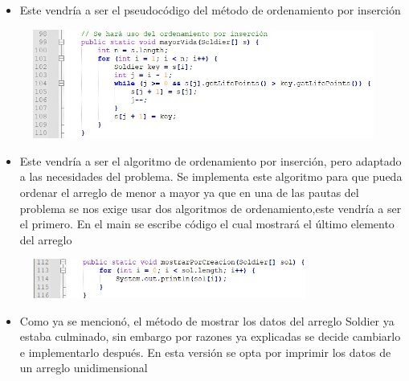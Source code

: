 \documentclass{article}
\begin{document}
	\begin{itemize}	
		\item Este vendría a ser el pseudocódigo del método de ordenamiento por inserción
	\end{itemize}
		
		
	\begin{figure}[H]
		\centering
		\includegraphics[width=1.2\textwidth,keepaspectratio]{img/5.jpg}
	\end{figure}	
		
	\begin{itemize}	
		\item Este vendría a ser el algoritmo de ordenamiento por inserción, pero adaptado a las necesidades del problema. Se implementa este algoritmo para que pueda ordenar el arreglo de menor a mayor ya que en una de las pautas del problema se nos exige usar dos algoritmos de ordenamiento,este vendría a ser el primero. En el main se escribe código el cual mostrará el último elemento del arreglo
	\end{itemize}
		
	\begin{figure}[H]
		\centering
		\includegraphics[width=0.8\textwidth,keepaspectratio]{img/6.jpg}
	\end{figure}
	 
	
	\begin{itemize}	
		\item Como ya se mencionó, el método de mostrar los datos del arreglo Soldier ya estaba culminado, sin embargo por razones ya explicadas se decide cambiarlo e implementarlo después. En esta versión se opta por imprimir los datos de un arreglo unidimensional 
	\end{itemize}
		
\end{document}
